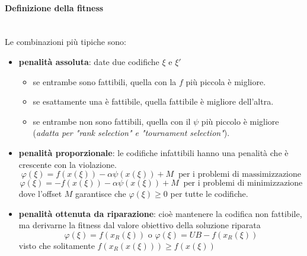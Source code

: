 \documentclass{article}
\begin{document}
\paragraph{Definizione della fitness}\mbox{}\\
Le combinazioni più tipiche sono:
\begin{itemize}
    \item \textbf{penalità assoluta}: date due codifiche $\xi$ e $\xi'$
    \begin{itemize}
        \item se entrambe sono fattibili, quella con la $f$ più piccola è migliore.
        \item se esattamente una è fattibile, quella fattibile è migliore dell'altra.
        \item se entrambe non sono fattibili, quella con il $\psi$ più piccolo è migliore
        (\textit{adatta per "rank selection" e "tournament selection"}).
    \end{itemize}

    \item \textbf{penalità proporzionale}: le codifiche infattibili hanno una penalità
    che è crescente con la violazione.
    $$\varphi(\xi)=f(x(\xi))-\alpha\psi(x(\xi))+M\;\;\text{per i problemi di massimizzazione}$$
    $$\varphi(\xi)=-f(x(\xi))-\alpha\psi(x(\xi))+M\;\;\text{per i problemi di minimizzazione}$$
    dove l'offset $M$ garantisce che $\varphi(\xi)\geq 0 $ per tutte le codifiche.
    \item \textbf{penalità ottenuta da riparazione}:
    cioè mantenere la codifica non fattibile, ma derivarne la fitness
    dal valore obiettivo della soluzione riparata
    $$\varphi(\xi)=f(x_R(\xi))\text{ o }\varphi(\xi)=UB-f(x_R(\xi))$$
    visto che solitamente $f(x_R(x(\xi)))\geq f(x(\xi))$
\end{itemize}
\end{document}
